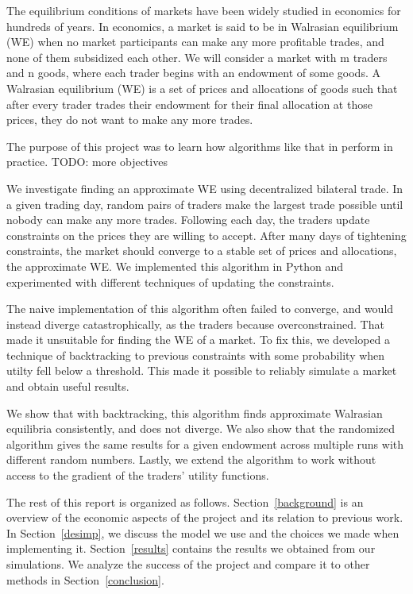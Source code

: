 \documentclass[12pt,a4paper,titlepage]{article}
\begin{document}
The equilibrium conditions of markets have been widely studied in economics for hundreds of years.
In economics, a market is said to be in Walrasian equilibrium (WE) when no market participants can make any more profitable trades, and none of them subsidized each other. 
We will consider a market with m traders and n goods, where each trader begins with an endowment of some goods.
A Walrasian equilibrium (WE) is a set of prices and allocations of goods such that after every trader trades their endowment for their final allocation at those prices, they do not want to make any more trades.

The purpose of this project was to learn how algorithms like that in \cite{crockett} perform in practice.
TODO: more objectives

We investigate finding an approximate WE using decentralized bilateral trade.
In a given trading day, random pairs of traders make the largest trade possible until nobody can make any more trades. 
Following each day, the traders update constraints on the prices they are willing to accept.
After many days of tightening constraints, the market should converge to a stable set of prices and allocations, the approximate WE.
We implemented this algorithm in Python and experimented with different techniques of updating the constraints.

The naive implementation of this algorithm often failed to converge, and would instead diverge catastrophically, as the traders because overconstrained.
That made it unsuitable for finding the WE of a market.
To fix this, we developed a technique of backtracking to previous constraints with some probability when utilty fell below a threshold.
This made it possible to reliably simulate a market and obtain useful results.

We show that with backtracking, this algorithm finds approximate Walrasian equilibria consistently, and does not diverge.
We also show that the randomized algorithm gives the same results for a given endowment across multiple runs with different random numbers.
Lastly, we extend the algorithm to work without access to the gradient of the traders' utility functions.


The rest of this report is organized as follows.
Section~\ref{background} is an overview of the economic aspects of the project and its relation to previous work.
In Section~\ref{desimp}, we discuss the model we use and the choices we made when implementing it.
Section~\ref{results} contains the results we obtained from our simulations.
We analyze the success of the project and compare it to other methods in Section~\ref{conclusion}. 
\end{document}
